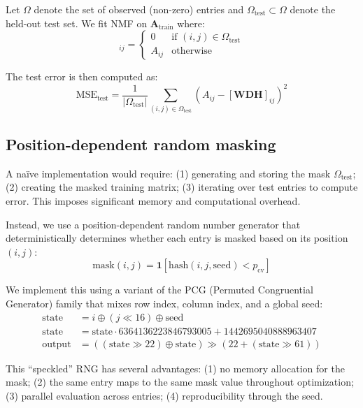 \documentclass[11pt]{article}
\begin{document}
Let $\Omega$ denote the set of observed (non-zero) entries and 
$\Omega_{\text{test}} \subset \Omega$ denote the held-out test set. We fit NMF 
on $\mathbf{A}_{\text{train}}$ where:
\begin{equation}
  [\mathbf{A}_{\text{train}}]_{ij} = \begin{cases}
    0 & \text{if } (i,j) \in \Omega_{\text{test}} \\
    A_{ij} & \text{otherwise}
  \end{cases}
  \label{eq:masking}
\end{equation}

The test error is then computed as:
\begin{equation}
  \text{MSE}_{\text{test}} = \frac{1}{|\Omega_{\text{test}}|} 
  \sum_{(i,j) \in \Omega_{\text{test}}} (A_{ij} - [\mathbf{W}\mathbf{D}
  \mathbf{H}]_{ij})^2
  \label{eq:test_mse}
\end{equation}

\subsection{Position-dependent random masking}

A na\"ive implementation would require: (1) generating and storing the mask 
$\Omega_{\text{test}}$; (2) creating the masked training matrix; (3) iterating 
over test entries to compute error. This imposes significant memory and 
computational overhead.

Instead, we use a position-dependent random number generator that deterministically 
determines whether each entry is masked based on its position $(i, j)$:
\begin{equation}
  \text{mask}(i, j) = \mathbf{1}[\text{hash}(i, j, \text{seed}) < p_{\text{cv}}]
  \label{eq:speckled}
\end{equation}

We implement this using a variant of the PCG (Permuted Congruential Generator) 
family \citep{ONeill2014} that mixes row index, column index, and a global seed:
\begin{align}
  \text{state} &= i \oplus (j \ll 16) \oplus \text{seed} \\
  \text{state} &= \text{state} \cdot 6364136223846793005 + 1442695040888963407 \\
  \text{output} &= ((\text{state} \gg 22) \oplus \text{state}) \gg 
  (22 + (\text{state} \gg 61))
  \label{eq:pcg}
\end{align}

This ``speckled'' RNG has several advantages: (1) no memory allocation for the 
mask; (2) the same entry maps to the same mask value throughout optimization; 
(3) parallel evaluation across entries; (4) reproducibility through the seed.
\end{document}
